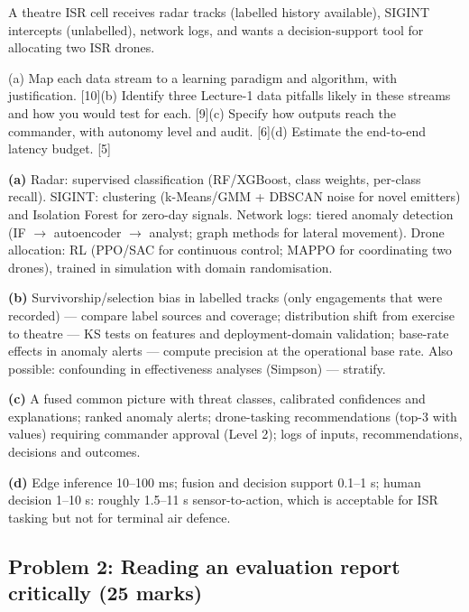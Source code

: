 \documentclass[11pt]{article}
\begin{document}
\begin{prob}A theatre ISR cell receives radar tracks (labelled history available), SIGINT intercepts (unlabelled), network logs, and wants a decision-support tool for allocating two ISR drones.

(a) Map each data stream to a learning paradigm and algorithm, with justification. [10]\newline (b) Identify three Lecture-1 data pitfalls likely in these streams and how you would test for each. [9]\newline (c) Specify how outputs reach the commander, with autonomy level and audit. [6]\newline (d) Estimate the end-to-end latency budget. [5]\end{prob}

\begin{soln}\textbf{(a)} Radar: supervised classification (RF/XGBoost, class weights, per-class recall). SIGINT: clustering (k-Means/GMM + DBSCAN noise for novel emitters) and Isolation Forest for zero-day signals. Network logs: tiered anomaly detection (IF $\rightarrow$ autoencoder $\rightarrow$ analyst; graph methods for lateral movement). Drone allocation: RL (PPO/SAC for continuous control; MAPPO for coordinating two drones), trained in simulation with domain randomisation.

\textbf{(b)} Survivorship/selection bias in labelled tracks (only engagements that were recorded) --- compare label sources and coverage; distribution shift from exercise to theatre --- KS tests on features and deployment-domain validation; base-rate effects in anomaly alerts --- compute precision at the operational base rate. Also possible: confounding in effectiveness analyses (Simpson) --- stratify.

\textbf{(c)} A fused common picture with threat classes, calibrated confidences and explanations; ranked anomaly alerts; drone-tasking recommendations (top-3 with values) requiring commander approval (Level 2); logs of inputs, recommendations, decisions and outcomes.

\textbf{(d)} Edge inference 10--100 ms; fusion and decision support 0.1--1 s; human decision 1--10 s: roughly 1.5--11 s sensor-to-action, which is acceptable for ISR tasking but not for terminal air defence.\end{soln}

\subsection{Problem 2: Reading an evaluation report critically \normalfont\small\color{GreyN}(25 marks)}
\end{document}
